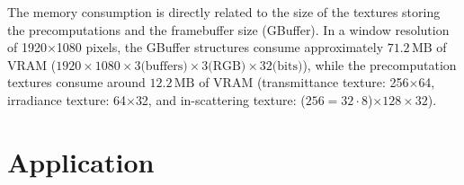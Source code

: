 \documentclass[journal]{vgtc}                %
\newcommand{\review}[1]{{\color{blue}#1}}
\begin{document}
The memory consumption is directly related to the size of the textures storing the precomputations and the framebuffer size (GBuffer). In a window resolution of 1920$\times$1080 pixels, the GBuffer structures consume approximately $71.2\,\text{MB}$ of VRAM ($1920\times1080 \times 3 \text{(buffers)} \times 3 \text{(RGB)} \times 32 \text{(bits)}$), while the precomputation textures consume around $12.2\,\text{MB}$ of VRAM (transmittance texture: 256$\times$64, irradiance texture: 64$\times$32, and in-scattering texture: ($256 = 32 \cdot 8$)$\times 128 \times 32$).


\vspace*{-1mm}
\section{Application} \label{sec:application}
\end{document}
